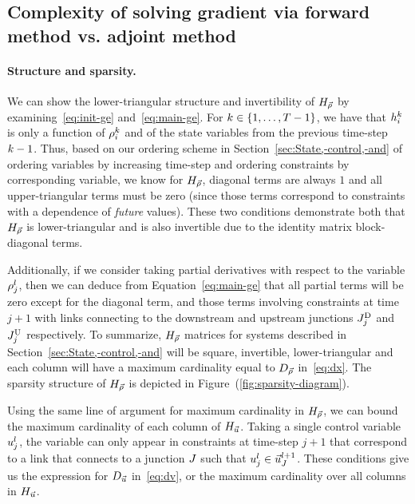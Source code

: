 								
				\subsection{Complexity of solving gradient via forward method vs. adjoint method\label{sub:Complexity-of-solving}}
								
								
				\paragraph{Structure and sparsity.\label{par:Structure-and-sparsity}}
								
				We can show the lower-triangular structure and invertibility of $H_{\vec{\rho}}$
				by examining~\eqref{eq:init-ge} and~\eqref{eq:main-ge}. For $\tind\in\intrange 1{\ntime-1}$,
				we have that $h_{i}^{k}$ is only a function of $\rho_{i}^{k}$
				and of the state variables from the previous time-step $k-1$.
				Thus, based on our ordering scheme in Section~\ref{sec:State,-control,-and}
				of ordering variables by increasing time-step and ordering constraints
				by corresponding variable, we know for $H_{\vec{\rho}}$, diagonal terms are
				always $1$ and all upper-triangular terms must be zero (since those
				terms correspond to constraints with a dependence of \emph{future}
				values). These two conditions demonstrate both that $H_{\vec{\rho}}$ is lower-triangular
				and is also invertible due to the identity matrix block-diagonal terms.
								
				Additionally, if we consider taking partial derivatives with respect
				to the variable $\rho_{j}^{l}$, then we can deduce from Equation~\eqref{eq:main-ge}
				that all partial terms will be zero except for the diagonal term,
				and those terms involving constraints at time $j+1$ with links connecting
				to the downstream and upstream junctions $J_{j}^{\text{D}}$ and $J_{j}^{\text{U}}$
				respectively. To summarize, $H_{\vec{\rho}}$ matrices for systems described
				in Section~\ref{sec:State,-control,-and} will be square, invertible,
				lower-triangular and each column will have a maximum cardinality equal
				to $D_{\vec{\rho}}$ in~\eqref{eq:dx}. The sparsity structure of
				$H_{\vec{\rho}}$ is depicted in Figure~(\ref{fig:sparsity-diagram}).
								
				Using the same line of argument for maximum cardinality in $H_{\vec{\rho}}$,
				we can bound the maximum cardinality of each column of $H_{\vec{u}}$. Taking
				a single control variable $u_{j}^{l}$, the variable can only
				appear in constraints at time-step $j+1$ that correspond to a link
				that connects to a junction $J$ such that $u_{j}^{l}\in\vec{u}_{J}^{l+1}$.
				These conditions give us the expression for $D_{\vec{u}}$ in~\eqref{eq:dv},
				or the maximum cardinality over all columns in $H_{\vec{u}}$.
								
